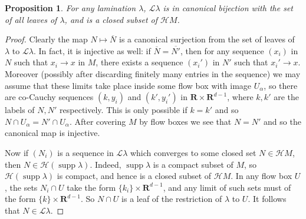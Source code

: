 \documentclass[reqno,10pt]{amsart}
\newcommand{\RR}{\mathbf{R}}
\newcommand*\dif{\mathop{}\!\mathrm{d}}
\DeclareMathOperator{\supp}{supp}
\newcommand{\Leaves}{\mathscr L}
\newcommand{\Hypspace}{\mathscr H}
\newtheorem{proposition}[theorem]{Proposition}
\theoremstyle{definition}
\numberwithin{equation}{section}
\begin{document}
\begin{proposition}
For any lamination $\lambda$, $\Leaves \lambda$ is in canonical bijection with the set of all leaves of $\lambda$, and is a closed subset of $\Hypspace M$.
\end{proposition}
\begin{proof}
Clearly the map $N \mapsto \overline N$ is a canonical surjection from the set of leaves of $\lambda$ to $\Leaves \lambda$.
In fact, it is injective as well: if $\overline N = \overline{N'}$, then for any sequence $(x_i)$ in $N$ such that $x_i \to x$ in $M$, there exists a sequence $(x_i')$ in $N'$ such that $x_i' \to x$.
Moreover (possibly after discarding finitely many entries in the sequence) we may assume that these limits take place inside some flow box with image $U_\alpha$, so there are co-Cauchy sequences $(k, y_i)$ and $(k', y_i')$ in $\RR \times \RR^{d - 1}$, where $k, k'$ are the labels of $N, N'$ respectively.
This is only possible if $k = k'$ and so $N \cap U_\alpha = N' \cap U_\alpha$.
After covering $M$ by flow boxes we see that $N = N'$ and so the canonical map is injective.

Now if $(N_i)$ is a sequence in $\Leaves \lambda$ which converges to some closed set $N \in \Hypspace M$, then $N \in \Hypspace(\supp \lambda)$.
Indeed, $\supp \lambda$ is a compact subset of $M$, so $\Hypspace(\supp \lambda)$ is compact, and hence is a closed subset of $\Hypspace M$.
In any flow box $U$, the sets $N_i \cap U$ take the form $\{k_i\} \times \RR^{d - 1}$, and any limit of such sets must of the form $\{k\} \times \RR^{d - 1}$.
So $N \cap U$ is a leaf of the restriction of $\lambda$ to $U$.
It follows that $N \in \Leaves \lambda$.
\end{proof}



\end{document}
